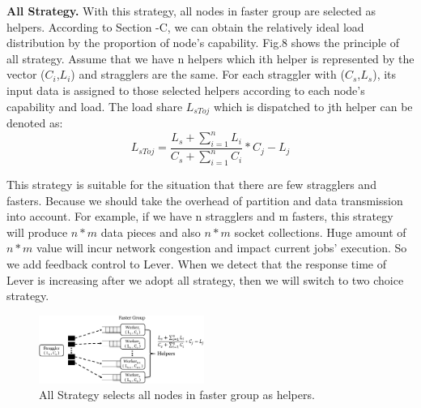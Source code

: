 \documentclass[10pt,conference,compsocconf,letterpaper]{IEEEtran}
\begin{document}
  \textbf{All Strategy.} With this strategy, all nodes in faster group are selected as helpers. According to Section \uppercase\expandafter{}-C, we can obtain the relatively ideal load distribution by the proportion of node's capability. Fig.8 shows the principle of all strategy. Assume that we have n helpers which ith helper is represented by the vector (\emph{$C_i$},\emph{$L_i$}) and stragglers are the same. For each straggler with (\emph{$C_s$},\emph{$L_s$}), its input data is assigned to those selected helpers according to each node's capability and load. The load share \emph{{$L_{sToj}$}} which is dispatched to jth helper can be denoted as:
  \begin{equation}
  L_{sToj} = \frac{L_s + \sum_{i=1}^n L_i}{C_s + \sum_{i=1}^n C_i}*C_j - L_j
  \end{equation}

  This strategy is suitable for the situation that there are few stragglers and fasters. Because we should take the overhead of partition and data transmission into account. For example, if we have n stragglers and m fasters, this strategy will produce $n*m$ data pieces and also $n*m$ socket collections. Huge amount of $n*m$ value will incur network congestion and impact current jobs' execution. So we add feedback control to Lever. When we detect that the response time of Lever is increasing after we adopt all strategy, then we will switch to two choice strategy.
  \begin{figure}[htbp]
    \centering
    \includegraphics[width=0.48\textwidth]{FigureS1}
    \caption{All Strategy selects all nodes in faster group as helpers.}
    \label{Fig. 8:}
  \end{figure}
\end{document}
